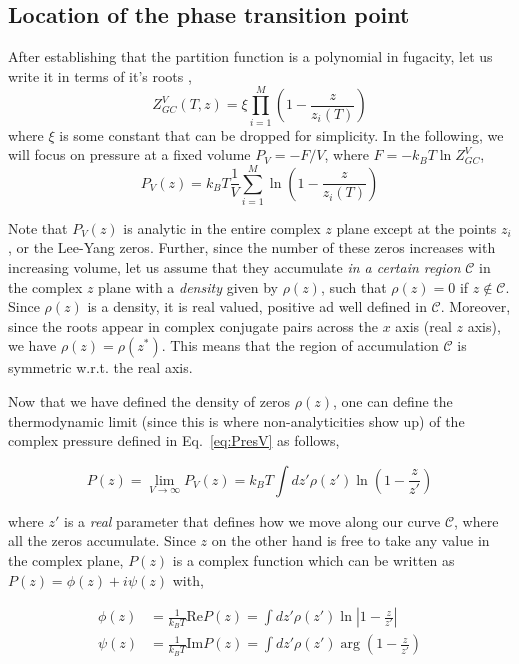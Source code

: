 \documentclass[11pt,a4paper]{article}
\begin{document}
\subsection{Location of the phase transition point}
After establishing that the partition function is a polynomial in fugacity, let us write it in terms of it's roots ,
\begin{equation}
Z_{GC}^V(T, z) = \xi \prod_{i=1}^{M} \left( 1 - \frac{z}{z_i(T)} \right)
\end{equation}
where $\xi$ is some constant that can be dropped for simplicity. In the following, we will focus on  pressure at a fixed volume $P_V = -F/V$, where $F = -k_B T \ln Z^V_{GC}$, 
\begin{equation}
    P_V(z) = k_B T \frac{1}{V} \sum_{i=1}^{M} \ln \left( 1 - \frac{z}{z_i(T)} \right)
    \label{eq:PresV}
\end{equation}

Note that $P_V(z)$ is analytic in the entire complex $z$ plane except at the points $z_i$, or the Lee-Yang zeros. Further, since the number of these zeros increases with increasing volume, let us assume that they accumulate \emph{in a certain region} $\mathcal{C}$ in the complex $z$ plane with a \emph{density} given by $\rho(z)$, such that $\rho(z) = 0$ if $z \notin \mathcal{C}$. Since $\rho(z)$ is a density, it is real valued, positive ad well defined in $\mathcal{C}$. Moreover, since the roots appear in complex conjugate pairs across the $x$ axis (real $z$ axis), we have $\rho(z) = \rho(z^*)$. This means that the region of accumulation $\mathcal{C}$ is symmetric w.r.t. the real axis.

Now that we have defined the density of zeros $\rho(z)$, one can define the thermodynamic limit (since this is where non-analyticities show up) of the complex pressure defined in Eq.~\ref{eq:PresV} as follows,

\begin{equation}
    P(z) = \lim_{V \to \infty} P_V(z)  = k_B T \int dz' \rho(z') \ln \left( 1 - \frac{z}{z'} \right)
\end{equation}

where $z'$ is a \emph{real} parameter that defines how we move along our curve $\mathcal{C}$, where all the zeros accumulate. Since $z$ on the other hand is free to take any value in the complex plane, $P(z)$ is a complex function which can be written as $P(z) = \phi(z) + i \psi(z)$ with,

\begin{align}
    \phi(z) &= \frac{1}{k_B T} \text{Re} P(z) = \int dz' \rho(z') \ln \left| 1 - \frac{z}{z'} \right| \nonumber \\
    \psi(z) &= \frac{1}{k_B T} \text{Im} P(z) = \int dz' \rho(z') \arg \left( 1 - \frac{z}{z'} \right)
\end{align}
\end{document}

